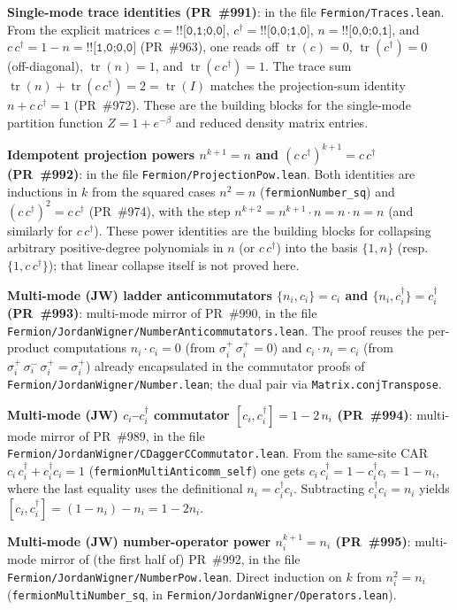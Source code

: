 \documentclass[a4paper,11pt]{article}
\begin{document}
\textbf{Single-mode trace identities (PR~\#991)}: in the file
\texttt{Fermion/Traces.lean}. From the explicit matrices
$c = \texttt{!![0,1;0,0]}$, $c^\dagger = \texttt{!![0,0;1,0]}$,
$n = \texttt{!![0,0;0,1]}$, and $c\,c^\dagger = 1 - n =
\texttt{!![1,0;0,0]}$ (PR~\#963), one reads off
$\operatorname{tr}(c) = 0$, $\operatorname{tr}(c^\dagger) = 0$
(off-diagonal), $\operatorname{tr}(n) = 1$, and
$\operatorname{tr}(c\,c^\dagger) = 1$. The trace sum
$\operatorname{tr}(n) + \operatorname{tr}(c\,c^\dagger) = 2 =
\operatorname{tr}(I)$ matches the projection-sum identity
$n + c\,c^\dagger = 1$ (PR~\#972). These are the building blocks
for the single-mode partition function $Z = 1 + e^{-\beta}$ and
reduced density matrix entries.

\textbf{Idempotent projection powers $n^{k+1} = n$ and
$(c\,c^\dagger)^{k+1} = c\,c^\dagger$ (PR~\#992)}: in the file
\texttt{Fermion/ProjectionPow.lean}. Both identities are
inductions in $k$ from the squared cases
$n^2 = n$ (\texttt{fermionNumber\_sq}) and
$(c\,c^\dagger)^2 = c\,c^\dagger$ (PR~\#974), with the step
$n^{k+2} = n^{k+1}\cdot n = n\cdot n = n$ (and similarly for
$c\,c^\dagger$). These power identities are the building blocks
for collapsing arbitrary positive-degree polynomials in $n$ (or
$c\,c^\dagger$) into the basis $\{1, n\}$ (resp.\ $\{1,
c\,c^\dagger\}$); that linear collapse itself is not proved here.

\textbf{Multi-mode (JW) ladder anticommutators $\{n_i,c_i\} = c_i$
and $\{n_i,c_i^\dagger\} = c_i^\dagger$ (PR~\#993)}: multi-mode
mirror of PR~\#990, in the file
\texttt{Fermion/JordanWigner/NumberAnticommutators.lean}. The
proof reuses the per-product computations $n_i\cdot c_i = 0$
(from $\sigma^+_i\,\sigma^+_i = 0$) and $c_i\cdot n_i = c_i$
(from $\sigma^+_i\,\sigma^-_i\,\sigma^+_i = \sigma^+_i$) already
encapsulated in the commutator proofs of
\texttt{Fermion/JordanWigner/Number.lean}; the dual pair via
\texttt{Matrix.conjTranspose}.

\textbf{Multi-mode (JW) $c_i$--$c_i^\dagger$ commutator
$[c_i,c_i^\dagger] = 1 - 2\,n_i$ (PR~\#994)}: multi-mode mirror
of PR~\#989, in the file
\texttt{Fermion/JordanWigner/CDaggerCCommutator.lean}. From the
same-site CAR $c_i\,c_i^\dagger + c_i^\dagger c_i = 1$
(\texttt{fermionMultiAnticomm\_self}) one gets
$c_i\,c_i^\dagger = 1 - c_i^\dagger c_i = 1 - n_i$, where the
last equality uses the definitional
$n_i = c_i^\dagger c_i$. Subtracting $c_i^\dagger c_i = n_i$
yields $[c_i,c_i^\dagger] = (1 - n_i) - n_i = 1 - 2 n_i$.

\textbf{Multi-mode (JW) number-operator power $n_i^{k+1} = n_i$
(PR~\#995)}: multi-mode mirror of (the first half of) PR~\#992,
in the file \texttt{Fermion/JordanWigner/NumberPow.lean}. Direct
induction on $k$ from $n_i^2 = n_i$
(\texttt{fermionMultiNumber\_sq}, in
\texttt{Fermion/JordanWigner/Operators.lean}).
\end{document}
